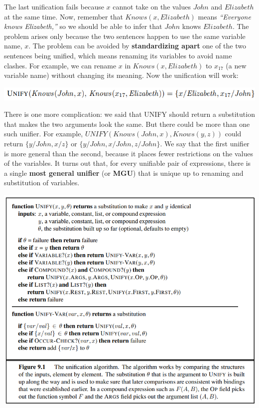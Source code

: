 The last unification fails because $x$ cannot take on the values $John$ and $Elizabeth$ at the same time. Now, remember that $Knows(x,Elizabeth)$ means \textit{“Everyone knows Elizabeth,”} so we should be able to infer that $John$ knows $Elizabeth$. The problem arises only because the two sentences happen to use the same variable name, $x$. The problem can be avoided by \textbf{standardizing apart} one of the two sentences being unified, which means renaming its variables to avoid name clashes. For example, we can rename $x$ in $Knows(x,Elizabeth)$ to $x_{17}$ (a new variable name) without changing its meaning. Now the unification will work:
\begin{center}
    \includegraphics[]{images/standardizing-apart.png}
\end{center}
There is one more complication: we said that UNIFY should return a substitution that makes the two arguments look the same. But there could be more than one such unifier. For example, $UNIFY(Knows(John, x), Knows(y, z))$ could return $\{y/John, x/z\}$ or $\{y/John, x/John, z/John\}$. We say that the first unifier is more general than the second, because it places fewer restrictions on the values of the variables.  It turns out that, for every unifiable pair of expressions, there is a single \textbf{most general unifier} (or \textbf{MGU}) that is unique up to renaming and substitution of variables.
\begin{center}
    \includegraphics[]{images/unify-algo.png}
\end{center}
